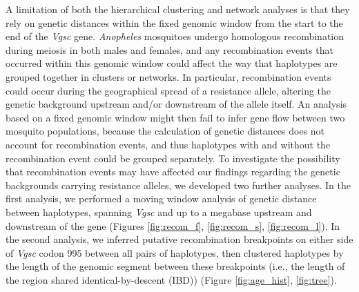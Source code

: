 \documentclass[a4paper,11pt,abstracton,hidelinks]{scrartcl}
\begin{document}
%
A limitation of both the hierarchical clustering and network analyses is that they rely on genetic distances within the fixed genomic window from the start to the end of the \textit{Vgsc} gene.
%
\textit{Anopheles} mosquitoes undergo homologous recombination during meiosis in both males and females, and any recombination events that occurred within this genomic window could affect the way that haplotypes are grouped together in clusters or networks.
%
In particular, recombination events could occur during the geographical spread of a resistance allele, altering the genetic background upstream and/or downstream of the allele itself.
%
An analysis based on a fixed genomic window might then fail to infer gene flow between two mosquito populations, because the calculation of genetic distances does not account for recombination events, and thus haplotypes with and without the recombination event could be grouped separately.
%
To investigate the possibility that recombination events may have affected our findings regarding the genetic backgrounds carrying resistance alleles, we developed two further analyses.
%
In the first analysis, we performed a moving window analysis of genetic distance between haplotypes, spanning \textit{Vgsc} and up to a megabase upstream and downstream of the gene (Figures \ref{fig:recom_f}, \ref{fig:recom_s}, \ref{fig:recom_l}).
%
In the second analysis, we inferred putative recombination breakpoints on either side of \textit{Vgsc} codon 995 between all pairs of haplotypes, then clustered haplotypes by the length of the genomic segment between these breakpoints (i.e., the length of the region shared identical-by-descent (IBD)) (Figure \ref{fig:age_hist}, \ref{fig:tree}).
%
\end{document}
